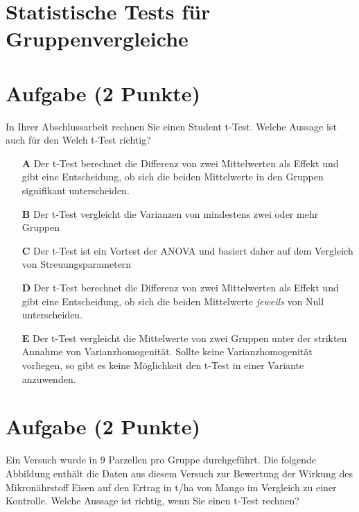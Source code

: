\documentclass[a4paper, 9pt]{scrartcl}\usepackage[]{graphicx}\usepackage[]{xcolor}
\begin{document}
\section*{Statistische Tests für Gruppenvergleiche} 

\section{Aufgabe \hfill (2 Punkte)}



In Ihrer Abschlussarbeit rechnen Sie einen Student t-Test. Welche Aussage ist auch für den Welch t-Test richtig?



\begin{enumerate}
\item [\textbf{A} \msquare] Der t-Test berechnet die Differenz von zwei Mittelwerten als Effekt und gibt eine Entscheidung, ob sich die beiden Mittelwerte in den Gruppen signifikant unterscheiden.
\item [\textbf{B} \msquare] Der t-Test vergleicht die Varianzen von mindestens zwei oder mehr Gruppen
\item [\textbf{C} \msquare] Der t-Test ist ein Vortest der ANOVA und basiert daher auf dem Vergleich von Streuungsparametern
\item [\textbf{D} \msquare] Der t-Test berechnet die Differenz von zwei Mittelwerten als Effekt und gibt eine Entscheidung, ob sich die beiden Mittelwerte \textit{jeweils} von Null unterscheiden.
\item [\textbf{E} \msquare] Der t-Test vergleicht die Mittelwerte von zwei Gruppen unter der strikten Annahme von Varianzhomogenität. Sollte keine Varianzhomogenität vorliegen, so gibt es keine Möglichkeit den t-Test in einer Variante anzuwenden.
\end{enumerate}

\section{Aufgabe \hfill (2 Punkte)}



Ein Versuch wurde in 9 Parzellen pro Gruppe durchgeführt. Die folgende Abbildung enthält die Daten aus diesem Versuch zur Bewertung der Wirkung des Mikronährstoff Eisen auf den Ertrag in t/ha von Mango im Vergleich zu einer Kontrolle.  Welche Aussage ist richtig, wenn Sie einen t-Test rechnen?
\end{document}
